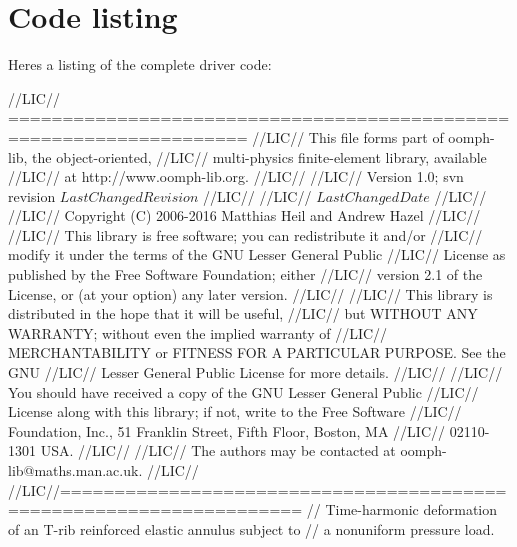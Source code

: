  

\hypertarget{index_code}{}\section{Code listing}\label{index_code}
Here\textquotesingle{}s a listing of the complete driver code\+:


\begin{DoxyCodeInclude}
\textcolor{comment}{//LIC// ====================================================================}
\textcolor{comment}{//LIC// This file forms part of oomph-lib, the object-oriented, }
\textcolor{comment}{//LIC// multi-physics finite-element library, available }
\textcolor{comment}{//LIC// at http://www.oomph-lib.org.}
\textcolor{comment}{//LIC// }
\textcolor{comment}{//LIC//    Version 1.0; svn revision $LastChangedRevision$}
\textcolor{comment}{//LIC//}
\textcolor{comment}{//LIC// $LastChangedDate$}
\textcolor{comment}{//LIC// }
\textcolor{comment}{//LIC// Copyright (C) 2006-2016 Matthias Heil and Andrew Hazel}
\textcolor{comment}{//LIC// }
\textcolor{comment}{//LIC// This library is free software; you can redistribute it and/or}
\textcolor{comment}{//LIC// modify it under the terms of the GNU Lesser General Public}
\textcolor{comment}{//LIC// License as published by the Free Software Foundation; either}
\textcolor{comment}{//LIC// version 2.1 of the License, or (at your option) any later version.}
\textcolor{comment}{//LIC// }
\textcolor{comment}{//LIC// This library is distributed in the hope that it will be useful,}
\textcolor{comment}{//LIC// but WITHOUT ANY WARRANTY; without even the implied warranty of}
\textcolor{comment}{//LIC// MERCHANTABILITY or FITNESS FOR A PARTICULAR PURPOSE.  See the GNU}
\textcolor{comment}{//LIC// Lesser General Public License for more details.}
\textcolor{comment}{//LIC// }
\textcolor{comment}{//LIC// You should have received a copy of the GNU Lesser General Public}
\textcolor{comment}{//LIC// License along with this library; if not, write to the Free Software}
\textcolor{comment}{//LIC// Foundation, Inc., 51 Franklin Street, Fifth Floor, Boston, MA}
\textcolor{comment}{//LIC// 02110-1301  USA.}
\textcolor{comment}{//LIC// }
\textcolor{comment}{//LIC// The authors may be contacted at oomph-lib@maths.man.ac.uk.}
\textcolor{comment}{//LIC// }
\textcolor{comment}{//LIC//====================================================================}
\textcolor{comment}{// Time-harmonic deformation of an T-rib reinforced elastic annulus subject to }
\textcolor{comment}{// a nonuniform pressure load.}


\end{DoxyCodeInclude}
